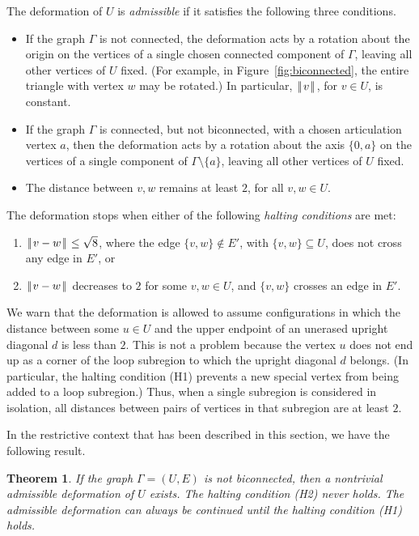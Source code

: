 \documentclass[11pt]{amsart}
\def\|{{\hskip0.1em|\hskip-0.15em|\hskip0.1em}}
\let\subset=\subseteq
\newtheorem{thm}{Theorem}
\begin{document}
The deformation of $U$ is {\it admissible} if it satisfies the following three conditions.
\begin{itemize}
\item If the graph $\Gamma$ is not connected,
the deformation acts by a rotation about the origin 
on the vertices of a single chosen connected component of $\Gamma$,
leaving all other vertices of $U$ fixed.  (For example, in Figure~\ref{fig:biconnected}, the entire triangle with vertex $w$ may be rotated.)  In particular,
$\|v\|$, for $v\in U$, is constant.
\item If the graph $\Gamma$ is connected, but not biconnected, with a chosen articulation vertex $a$, then
the deformation acts by a rotation about the axis $\{0,a\}$ on the vertices of a single component of $\Gamma\setminus\{a\}$,
leaving all other vertices of $U$ fixed.
\item The distance between $v,w$ remains at least $2$, for all $v,w\in U$.
\end{itemize}

The deformation stops when either of the following {\it halting conditions} are met:
{
\renewcommand{\labelenumi}{(H{\theenumi})}
\begin{enumerate}
\item $\|v-w\|\le\sqrt8$, where the edge $\{v,w\}\not\in E'$, with $\{v,w\}\subset U$, does not cross any edge in $E'$, or
\item $\|v-w\|$ decreases to $2$ for some $v,w\in U$, and $\{v,w\}$ crosses an edge in $E'$.
\end{enumerate}
}

We warn that the deformation is allowed to assume configurations in which the distance between some $u\in U$ and the upper endpoint of an unerased upright diagonal $d$ is less than $2$.  This is not a problem because the vertex $u$ does not end up as a corner of the loop subregion to which the upright diagonal $d$ belongs.  (In particular, the halting condition (H1) prevents a new special vertex from being added to a loop subregion.) Thus, when a single subregion is considered in isolation, all distances between pairs of vertices in that subregion are at least $2$.

In the restrictive context that has been described in this section, we have the following result.

\begin{thm}\label{thm:biconnected}  
If the graph $\Gamma=(U,E)$ is not biconnected, then a nontrivial admissible
deformation 
of $U$ exists. 
The  halting condition (H2) never holds.  The admissible
deformation can always be continued until the halting
condition (H1) holds.
\end{thm}
\end{document}
